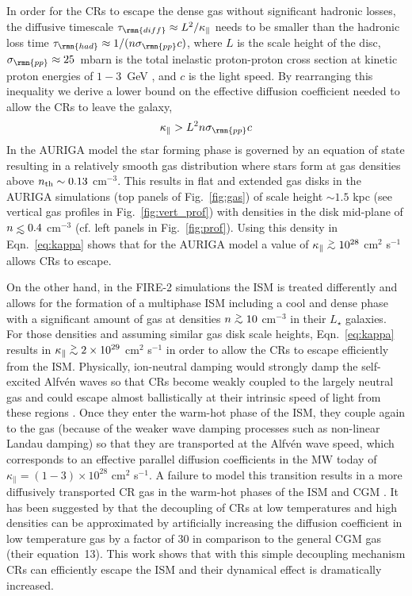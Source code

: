 \documentclass[useAMS,usenatbib]{mnras}
\newcommand{\gtsima}{$\; \buildrel > \over \sim \;$}
\newcommand{\gsim}{\lower.5ex\hbox{\gtsima}}
\def\lesssim{\mathrel{\hbox{\rlap{\hbox{\lower4pt\hbox{$\sim$}}}\hbox{$<$}}}}
\begin{document}
In order for the CRs to escape the dense gas without significant hadronic losses, the diffusive timescale $\tau_\rmn{diff} \approx L^2/\kappa_\parallel$ needs to be smaller than the hadronic loss time $\tau_\rmn{had} \approx 1 / (n \sigma_\rmn{pp} c)$, where $L$ is the scale height of the disc, $\sigma_\rmn{pp}\approx25$~mbarn is the total inelastic proton-proton cross section at kinetic proton energies of $1-3$~GeV \citep{Kafexhiu2014}, and $c$ is the light speed. By rearranging this inequality we derive a lower bound on the effective diffusion coefficient needed to allow the CRs to leave the galaxy, 
\begin{align}
    \label{eq:kappa}
    \kappa_\parallel>L^2n\sigma_\rmn{pp} c
\end{align}
In the AURIGA model the star forming phase is governed by an equation of state \citep{Springel2003} resulting in a relatively smooth gas distribution where stars form at gas densities above $n_{\rm th}\sim0.13$ cm$^{-3}$. This results in flat and extended gas disks in the AURIGA simulations (top panels of Fig.~\ref{fig:gas}) of scale height $\sim1.5$ kpc (see vertical gas profiles in Fig.~\ref{fig:vert_prof}) with densities in the disk mid-plane of $n\lesssim 0.4$ cm$^{-3}$ (cf. left panels in Fig.~\ref{fig:prof}). Using this density in Eqn.~\eqref{eq:kappa} shows that for the AURIGA model a value of  $\kappa_\parallel\gsim10^{28}$ cm$^{2}$ s$^{-1}$ allows CRs to escape.

On the other hand, in the FIRE-2 simulations the ISM is treated differently and allows for the formation of a multiphase ISM including a cool and dense phase with a significant amount of gas at densities $n\gsim10$ cm$^{-3}$ \citep[see Fig. 9 of][]{Hopkins2019} in their $L_\star$ galaxies. For those densities and assuming similar gas disk scale heights, Eqn.~\eqref{eq:kappa} results in $\kappa_\parallel\gsim2\times10^{29}$ cm$^{2}$ s$^{-1}$ in order to allow the CRs to escape efficiently from the ISM.
Physically, ion-neutral damping would strongly damp the self-excited Alfv\'en waves so that CRs become weakly coupled to the largely neutral gas and could escape almost ballistically at their intrinsic speed of light from these regions \citep{Wiener2017}. Once they enter the warm-hot phase of the ISM, they couple again to the gas (because of the weaker wave damping processes such as non-linear Landau damping) so that they are transported at the Alfv\'en wave speed, which corresponds to an effective parallel diffusion coefficients in the MW today of $\kappa_\parallel=(1-3)\times10^{28}$ cm$^{2}$ s$^{-1}$. A failure to model this transition results in a more diffusively transported CR gas in the warm-hot phases of the ISM and CGM \citep[see also discussion in][]{Salem2014b}. It has been suggested by \citet{Farber2018} that the decoupling of CRs at low temperatures and high densities can be approximated by artificially increasing the diffusion coefficient in low temperature gas by a factor of 30 in comparison to the general CGM gas (their equation~13). This work shows that with this simple decoupling mechanism CRs can efficiently escape the ISM and their dynamical effect is dramatically increased.
\end{document}
